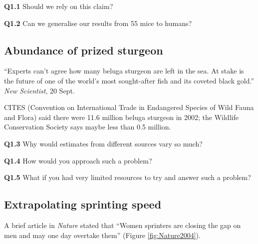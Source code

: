 \documentclass[
  oneside]{krantz}
\begin{document}
\textbf{Q1.1} Should we rely on this claim?

\textbf{Q1.2} Can we generalise our results from 55 mice to humans?

\hypertarget{abundance-of-prized-sturgeon}{%
\subsection{Abundance of prized sturgeon}\label{abundance-of-prized-sturgeon}}

``Experts can't agree how many beluga sturgeon are left in the sea. At stake is the future of one of the world's most sought-after fish and its coveted black gold.'' \emph{New Scientist}, 20 Sept. \citeyearpar{pearce2003high}

CITES (Convention on International Trade in Endangered Species of Wild Fauna and Flora) said there were 11.6 million beluga sturgeon in 2002; the Wildlife Conservation Society says maybe less than 0.5 million.

\textbf{Q1.3} Why would estimates from different sources vary so much?

\textbf{Q1.4} How would you approach such a problem?

\textbf{Q1.5} What if you had very limited resources to try and answer such a problem?

\hypertarget{extrapolating-sprinting-speed}{%
\subsection{Extrapolating sprinting speed}\label{extrapolating-sprinting-speed}}

A brief article in \emph{Nature} \citep{Tatemetal2004} stated that ``Women sprinters are closing the gap on men and may one day overtake them'' (Figure \ref{fig:Nature2004}).
\end{document}
